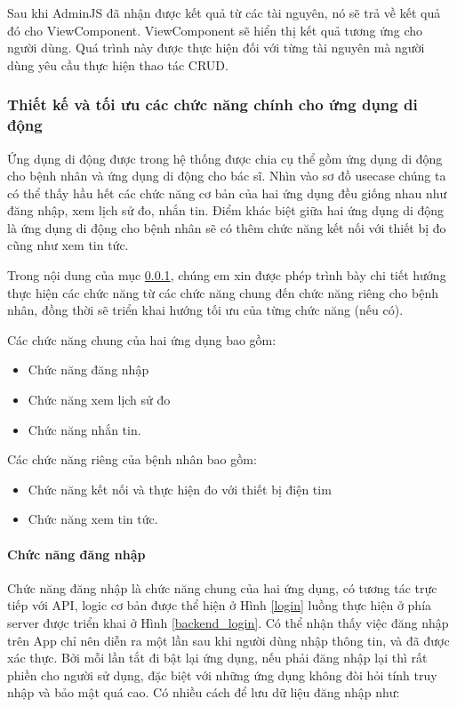 Sau khi AdminJS đã nhận được kết quả từ các tài nguyên, nó sẽ trả về kết quả đó cho ViewComponent. ViewComponent sẽ hiển thị kết quả tương ứng cho người dùng. Quá trình này được thực hiện đối với từng tài nguyên mà người dùng yêu cầu thực hiện thao tác CRUD.

\subsubsection{Thiết kế và tối ưu các chức năng chính cho ứng dụng di động}
\label{design_function_mobile}

Ứng dụng di động được trong hệ thống được chia cụ thể gồm ứng dụng di động cho bệnh nhân và ứng dụng di động cho bác sĩ. Nhìn vào
sơ đồ usecase chúng ta có thể thấy hầu hết các chức năng cơ bản của hai ứng dụng đều giống nhau như đăng nhập, xem lịch sử đo, nhắn tin.
Điểm khác biệt giữa hai ứng dụng di động là ứng dụng di động cho bệnh nhân sẽ có thêm chức năng kết nối với thiết bị đo cũng như xem tin tức.

Trong nội dung của mục \ref{design_function_mobile}, chúng em xin được phép trình bày chi tiết hướng thực hiện các chức năng
từ các chức năng chung đến chức năng riêng cho bệnh nhân, đồng thời sẽ triển khai hướng tối ưu của từng chức năng (nếu có).

Các chức năng chung của hai ứng dụng bao gồm: 
\begin{itemize}
  \item Chức năng đăng nhập
  \item Chức năng xem lịch sử đo
  \item Chức năng nhắn tin.
\end{itemize}

Các chức năng riêng của bệnh nhân bao gồm:
\begin{itemize}
  \item Chức năng kết nối và thực hiện đo với thiết bị điện tim
  \item Chức năng xem tin tức.
\end{itemize}

\paragraph{Chức năng đăng nhập}
\mbox{}

Chức năng đăng nhập là chức năng chung của hai ứng dụng, có tương tác trực tiếp với API, logic cơ bản được thể hiện ở Hình \ref{login}
luồng thực hiện ở phía server được triển khai ở 
Hình \ref{backend_login}. Có thể nhận thấy việc đăng nhập trên App chỉ nên diễn ra một lần sau khi người dùng nhập thông tin,
và đã được xác thực. Bởi mỗi lần tắt đi bật lại ứng dụng, nếu phải đăng nhập lại thì rất phiền cho người sử dụng, đặc biệt
với những ứng dụng không đòi hỏi tính truy nhập và bảo mật quá cao. Có nhiều cách để lưu dữ liệu đăng nhập như:

